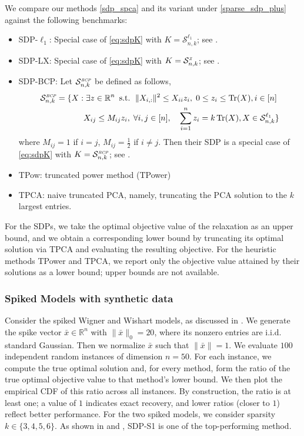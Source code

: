 \documentclass[11pt]{amsart}
\newcommand{\Sone}[2]{\ensuremath{\mathcal{S}_{#1,#2}^{\ell_1}}}
\newcommand{\Sz}[2]{\ensuremath{\mathcal{S}_{#1,#2}^{\textit{\tiny{Z}}}}}
\newcommand{\Sbs}[2]{\ensuremath{\mathcal{S}_{#1,#2}^{\textit{\tiny{BCP}}}}}
\theoremstyle{plain}
\theoremstyle{definition}
\theoremstyle{remark}
\newcommand{\RR}{\mathbb{R}}
\newcommand{\st}{\text{\, s.t.\, }}
\DeclareMathOperator{\tr}{Tr}
\begin{document}
	We compare our methods \eqref{sdp_spca} and its variant under \eqref{sparse_sdp_plus} against the following benchmarks:
	\begin{itemize}
		\item SDP-\(\ell_1\): Special case of \eqref{eq:sdpK} with $K = \Sone{n}{k}$; see \cite{d2004direct}.
		\item SDP-LX: Special case of \eqref{eq:sdpK} with \(K=\Sz{n}{k}\); see \cite{li2025exact}.
		
		\item SDP-BCP: 
		Let \(\Sbs{n}{k}\) be defined as follows,
		\begin{equation}
			\begin{split}
				\Sbs{n}{k} = \{X: &\; \exists z \in \RR^n \st 
				\|X_{i,:}\|^2\leq X_{ii}z_i,\;0\leq z_i\leq \tr(X), i\in[n]\\
				&X_{ij}\leq M_{ij}z_i,\;\forall i,j\in[n],\quad  \sum_{i=1}^n z_i = k \tr(X),X\in \Sone{n}{k}\}
			\end{split}
		\end{equation}
		where \(M_{ij} = 1\) if \(i=j\), \(M_{ij} = \tfrac{1}{2}\) if \(i\neq j\). Then their SDP is  a special case of  \eqref{eq:sdpK} with \(K=\Sbs{n}{k}\); see \cite{bertsimas2022solving}.
		\item TPow: truncated power method (TPower\cite{yuan2013truncated})
		\item TPCA: naive truncated PCA, namely, truncating the PCA solution to the \(k\) largest entries.
	\end{itemize}
	For the SDPs, we take the optimal objective value of the relaxation as an upper bound, and we obtain a corresponding lower bound by truncating its optimal solution via TPCA and evaluating the resulting objective.
	For the heuristic methods TPower and TPCA, we report only the objective value attained by their solutions as a lower bound; upper bounds are not available.
	
	\subsubsection{Spiked Models with synthetic data}
	
	Consider the spiked Wigner and Wishart models, as discussed in .
	We generate the spike vector \(\bar x\in \RR^n\) with \(\|\bar x\|_0=20\), where its nonzero entries are i.i.d. standard Gaussian. Then we normalize \(\bar x\) such that \(\|\bar x\|=1\).
	We evaluate \(100\) independent random instances of dimension \(n=50\).
	For each instance, we compute the true optimal solution and, for every method, form the ratio of the true optimal objective value to that method’s lower bound. We then plot the empirical CDF of this ratio across all instances. By construction, the ratio is at least one; a value of \(1\) indicates exact recovery, and lower ratios (closer to \(1\)) reflect better performance. For the two spiked models, we consider sparsity \(k \in \{3,4,5,6\}\). As shown in  and , SDP-S1 is one of the top-performing method. 
	
\end{document}
